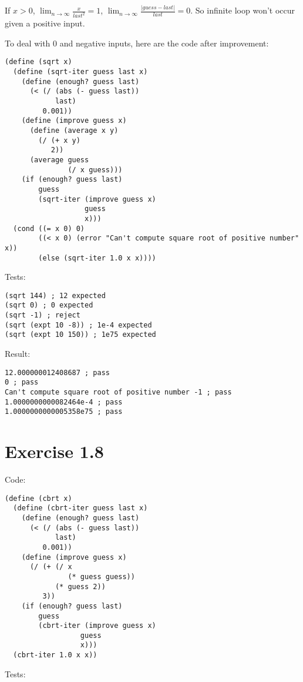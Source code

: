 \documentclass[../main.tex]{subfiles}
\begin{document}
If $x > 0$, $\lim_{n \to \infty}\frac{x}{last^2} = 1$, 
 $\lim_{n \to \infty}\frac{|guess-last|}{last} = 0$. So
 infinite loop won't occur given a positive input.

To deal with 0 and negative inputs, here are the code after
 improvement:

\begin{lstlisting}
(define (sqrt x)
  (define (sqrt-iter guess last x)
    (define (enough? guess last)
      (< (/ (abs (- guess last))
            last)
         0.001))
    (define (improve guess x)
      (define (average x y)
        (/ (+ x y)
           2))
      (average guess
               (/ x guess)))
    (if (enough? guess last)
        guess
        (sqrt-iter (improve guess x)
                   guess
                   x)))
  (cond ((= x 0) 0)
        ((< x 0) (error "Can't compute square root of positive number" x))
        (else (sqrt-iter 1.0 x x))))
\end{lstlisting}

Tests:

\begin{lstlisting}
(sqrt 144) ; 12 expected
(sqrt 0) ; 0 expected
(sqrt -1) ; reject
(sqrt (expt 10 -8)) ; 1e-4 expected
(sqrt (expt 10 150)) ; 1e75 expected
\end{lstlisting}

Result:

\begin{lstlisting}
12.000000012408687 ; pass
0 ; pass
Can't compute square root of positive number -1 ; pass
1.0000000000082464e-4 ; pass
1.0000000000005358e75 ; pass
\end{lstlisting}

\section{Exercise 1.8}

Code:

\begin{lstlisting}
(define (cbrt x)
  (define (cbrt-iter guess last x)
    (define (enough? guess last)
      (< (/ (abs (- guess last))
            last)
         0.001))
    (define (improve guess x)
      (/ (+ (/ x
               (* guess guess))
            (* guess 2))
         3))
    (if (enough? guess last)
        guess
        (cbrt-iter (improve guess x)
                  guess
                  x)))
  (cbrt-iter 1.0 x x))
\end{lstlisting}

Tests:
\end{document}
